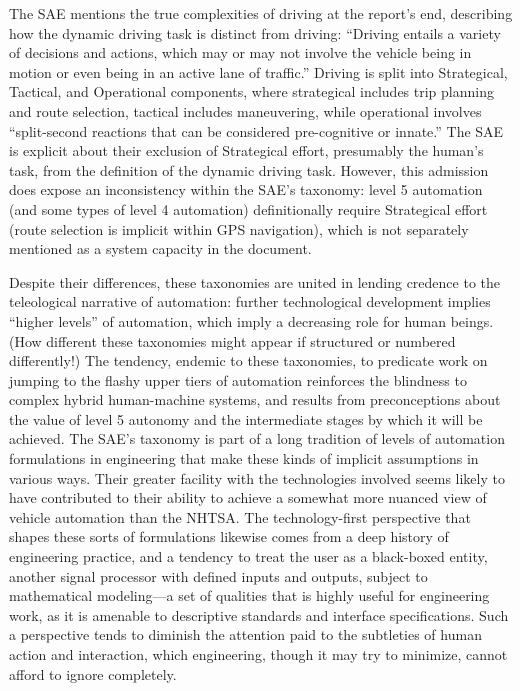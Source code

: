 The SAE mentions the true complexities of driving at the report's end,
describing how the dynamic driving task is distinct from driving:
``Driving entails a variety of decisions and actions, which may or may
not involve the vehicle being in motion or even being in an active
lane of traffic.''\cite[p. 12]{SAE} Driving is split into Strategical, Tactical, and
Operational components, where strategical includes trip planning and
route selection, tactical includes maneuvering, while operational
involves ``split-second reactions that can be considered pre-cognitive
or innate.''\cite{Michon} The SAE is explicit about their exclusion of Strategical
effort, presumably the human's task, from the definition of the
dynamic driving task. However, this admission does expose an
inconsistency within the SAE's taxonomy: level 5 automation (and some
types of level 4 automation) definitionally require Strategical effort
(route selection is implicit within GPS navigation), which is not
separately mentioned as a system capacity in the document.

Despite their differences, these taxonomies are united in lending
credence to the teleological narrative of automation:  further
technological development implies ``higher levels'' of automation, which
imply a decreasing role for human beings. (How different these
taxonomies might appear if structured or numbered differently!)
The tendency, endemic to these taxonomies, to predicate work on
jumping to the flashy upper tiers of automation reinforces the
blindness to complex hybrid human-machine systems, and results from
preconceptions about the value of level 5 autonomy and the
intermediate stages by which it will be achieved. The SAE's taxonomy
is part of a long tradition of levels of automation formulations in
engineering that make these kinds of implicit assumptions in various
ways.\cite{ParasuramanW} \cite{PSWickens} \cite{ALFUS} \cite{SMART} Their
greater facility with the technologies involved seems likely to have
contributed to their ability to achieve a somewhat more nuanced view
of vehicle automation than the NHTSA. The
technology-first perspective that shapes these sorts of formulations
likewise comes from a deep history of engineering practice, and a
tendency to treat the user as a black-boxed entity, another signal
processor with defined inputs and outputs, subject to mathematical
modeling---a set of qualities that is highly useful for engineering
work, as it is amenable to descriptive standards and interface
specifications. Such a perspective tends to diminish the attention
paid to
the subtleties of human action and interaction, which engineering,
though it may try to minimize, cannot afford to ignore completely.


